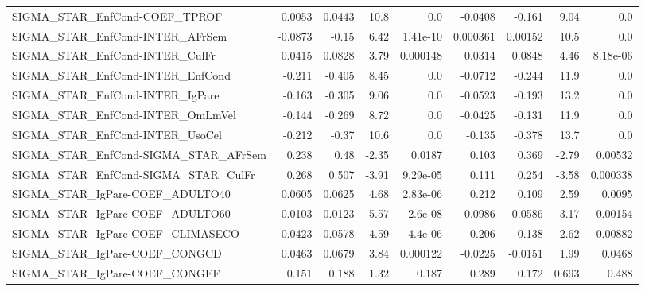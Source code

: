 \begin{tabular}{lrrrrrrrr}
SIGMA\_STAR\_EnfCond-COEF\_TPROF         &      0.0053 &       0.0443 &     10.8 &      0.0 &    -0.0408 &      -0.161 &         9.04 &           0.0 \\
SIGMA\_STAR\_EnfCond-INTER\_AFrSem       &     -0.0873 &        -0.15 &     6.42 & 1.41e-10 &   0.000361 &     0.00152 &         10.5 &           0.0 \\
SIGMA\_STAR\_EnfCond-INTER\_CulFr        &      0.0415 &       0.0828 &     3.79 & 0.000148 &     0.0314 &      0.0848 &         4.46 &      8.18e-06 \\
SIGMA\_STAR\_EnfCond-INTER\_EnfCond      &      -0.211 &       -0.405 &     8.45 &      0.0 &    -0.0712 &      -0.244 &         11.9 &           0.0 \\
SIGMA\_STAR\_EnfCond-INTER\_IgPare       &      -0.163 &       -0.305 &     9.06 &      0.0 &    -0.0523 &      -0.193 &         13.2 &           0.0 \\
SIGMA\_STAR\_EnfCond-INTER\_OmLmVel      &      -0.144 &       -0.269 &     8.72 &      0.0 &    -0.0425 &      -0.131 &         11.9 &           0.0 \\
SIGMA\_STAR\_EnfCond-INTER\_UsoCel       &      -0.212 &        -0.37 &     10.6 &      0.0 &     -0.135 &      -0.378 &         13.7 &           0.0 \\
SIGMA\_STAR\_EnfCond-SIGMA\_STAR\_AFrSem  &       0.238 &         0.48 &    -2.35 &   0.0187 &      0.103 &       0.369 &        -2.79 &       0.00532 \\
SIGMA\_STAR\_EnfCond-SIGMA\_STAR\_CulFr   &       0.268 &        0.507 &    -3.91 & 9.29e-05 &      0.111 &       0.254 &        -3.58 &      0.000338 \\
SIGMA\_STAR\_IgPare-COEF\_ADULTO40       &      0.0605 &       0.0625 &     4.68 & 2.83e-06 &      0.212 &       0.109 &         2.59 &        0.0095 \\
SIGMA\_STAR\_IgPare-COEF\_ADULTO60       &      0.0103 &       0.0123 &     5.57 &  2.6e-08 &     0.0986 &      0.0586 &         3.17 &       0.00154 \\
SIGMA\_STAR\_IgPare-COEF\_CLIMASECO      &      0.0423 &       0.0578 &     4.59 &  4.4e-06 &      0.206 &       0.138 &         2.62 &       0.00882 \\
SIGMA\_STAR\_IgPare-COEF\_CONGCD         &      0.0463 &       0.0679 &     3.84 & 0.000122 &    -0.0225 &     -0.0151 &         1.99 &        0.0468 \\
SIGMA\_STAR\_IgPare-COEF\_CONGEF         &       0.151 &        0.188 &     1.32 &    0.187 &      0.289 &       0.172 &        0.693 &         0.488 \\

\end{tabular}
